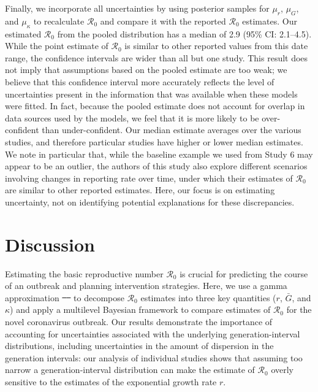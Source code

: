 \documentclass[12pt]{article}
\newcommand{\Ro}{\ensuremath{{\mathcal R}_{0}}\xspace}
\providecommand{\DIFaddtex}[1]{{\protect\color{blue}\uwave{#1}}} %
\providecommand{\DIFdeltex}[1]{{\protect\color{red}\sout{#1}}}                      %
\providecommand{\DIFaddbegin}{} %
\providecommand{\DIFaddend}{} %
\providecommand{\DIFdelbegin}{} %
\providecommand{\DIFdelend}{} %
\providecommand{\DIFadd}[1]{\texorpdfstring{\DIFaddtex{#1}}{#1}} %
\providecommand{\DIFdel}[1]{\texorpdfstring{\DIFdeltex{#1}}{}} %
\newcommand{\DIFscaledelfig}{0.5}
\newlength{\DIFdelgraphicswidth} %
\newlength{\DIFdelgraphicsheight} %
\newcommand{\DIFaddincludegraphics}[2][]{{\color{blue}\fbox{\DIFOincludegraphics[#1]{#2}}}} %
\newcommand{\DIFdelincludegraphics}[2][]{%
\sbox{\DIFdelgraphicsbox}{\DIFOincludegraphics[#1]{#2}}%
\settoboxwidth{\DIFdelgraphicswidth}{\DIFdelgraphicsbox} %
\settoboxtotalheight{\DIFdelgraphicsheight}{\DIFdelgraphicsbox} %
\scalebox{\DIFscaledelfig}{%
\parbox[b]{\DIFdelgraphicswidth}{\usebox{\DIFdelgraphicsbox}\\[-\baselineskip] \rule{\DIFdelgraphicswidth}{0em}}\llap{\resizebox{\DIFdelgraphicswidth}{\DIFdelgraphicsheight}{%
\setlength{\unitlength}{\DIFdelgraphicswidth}%
\begin{picture}(1,1)%
\thicklines\linethickness{2pt} %
{\color[rgb]{1,0,0}\put(0,0){\framebox(1,1){}}}%
{\color[rgb]{1,0,0}\put(0,0){\line( 1,1){1}}}%
{\color[rgb]{1,0,0}\put(0,1){\line(1,-1){1}}}%
\end{picture}%
}\hspace*{3pt}}} %
} %
\DeclareRobustCommand{\DIFaddbegin}{\DIFOaddbegin \let\includegraphics\DIFaddincludegraphics} %
\DeclareRobustCommand{\DIFaddend}{\DIFOaddend \let\includegraphics\DIFOincludegraphics} %
\DeclareRobustCommand{\DIFdelbegin}{\DIFOdelbegin \let\includegraphics\DIFdelincludegraphics} %
\DeclareRobustCommand{\DIFdelend}{\DIFOaddend \let\includegraphics\DIFOincludegraphics} %
\begin{document}
Finally, we incorporate all uncertainties by using posterior samples for $\mu_r$, $\mu_G$, and $\mu_\kappa$ to recalculate \Ro and compare it with the reported \Ro estimates.
Our estimated \Ro from the pooled distribution has a median of 2.9 (95\% CI: 2.1--4.5).
While the point estimate of \Ro is similar to other reported values from this date range, the confidence intervals are wider than all but one study.
This result does not imply that assumptions based on the pooled estimate are too weak;
we believe that this confidence interval more accurately reflects the level of uncertainties present in the information that was available when these models were fitted.
In fact, because the pooled estimate does not account for overlap in data sources used by the models, we feel that it is more likely to be over-confident than under-confident.
Our median estimate averages over the various studies, and therefore particular studies have higher or lower median estimates.
We note in particular that, while the baseline example we used from Study 6 may appear to be an outlier, the authors of this study also explore different scenarios involving changes in reporting rate over time, under which their estimates of \Ro are similar to other reported estimates.
Here, our focus is on estimating uncertainty, not on identifying potential explanations for these discrepancies.

\section{Discussion}

Estimating the basic reproductive number \Ro is crucial for predicting the course of an outbreak and planning intervention strategies.
Here, we use a gamma approximation \DIFdelbegin \DIFdel{\mbox{%
\citep{park2019practical} }\hspace{0pt}%
}\DIFdelend \DIFaddbegin \DIFadd{\mbox{%
\cite{park2019practical} }\hspace{0pt}%
}\DIFaddend to decompose \Ro estimates into three key quantities ($r$, $\bar G$, and $\kappa$) and apply a multilevel Bayesian framework to compare estimates of \Ro for the novel coronavirus outbreak.
Our results demonstrate the importance of accounting for uncertainties associated with the underlying generation-interval distributions, including uncertainties in the amount of dispersion in the generation intervals:
our analysis of individual studies shows that assuming too narrow a generation-interval distribution can make the estimate of \Ro overly sensitive to the estimates of the exponential growth rate $r$.
\end{document}
